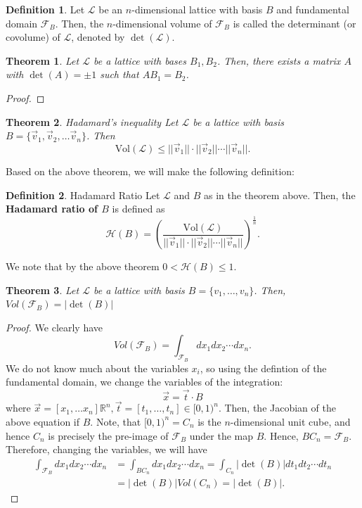 \documentclass{article}
\newtheorem{theorem}{Theorem}[section]
\theoremstyle{definition}
\newtheorem{definition}{Definition}[section]
\renewcommand{\L}{\mathcal{L}}
\newcommand{\F}{\mathcal{F}}
\newcommand{\Reals}{\mathbb{R}}
\renewcommand{\H}{\mathcal{H}}
\newcommand{\norm}[1]{||#1||}
\begin{document}
\begin{definition}
  Let $\L$ be an $n$-dimensional lattice with basis $B$ and fundamental domain
  $\F_B$. Then, the $n$-dimensional volume of $\F_B$ is called the determinant
  (or covolume) of $\L$, denoted by $\det(\L)$.
\end{definition}
\begin{theorem}
  \label{thm:lattice_change_of_basis}
  Let $\L$ be a lattice with bases $B_1, B_2$. Then, there exists a matrix $A$
  with $\det(A) = \pm 1$ such that $AB_1 = B_2$.
\end{theorem}
\begin{proof}
\end{proof}
\begin{theorem}{Hadamard's inequality}
  Let $\L$ be a lattice with basis $B = \{\vec{v}_1, \vec{v}_2, \hdots \vec{v}_n\}$. Then
\[
  \text{Vol}(\L) \leq \norm{\vec{v}_1}\cdot\norm{\vec{v}_2}\cdots\norm{\vec{v}_n}.
\]
\end{theorem}
Based on the above theorem, we will make the following definition:
\begin{definition}{Hadamard Ratio}
  Let $\L$ and $B$ as in the theorem above. Then, the \textbf{Hadamard ratio of $B$}
  is defined as
  \[
    \H(B) = \left( \frac{\text{Vol}(\L)}{\norm{\vec{v}_1}\cdot\norm{\vec{v}_2}\cdots\norm{\vec{v}_n}} \right)^{\frac1n}.
  \]
\end{definition}
We note that by the above theorem $0 < \H(B) \leq 1$.
\begin{theorem}
  Let $\L$ be a lattice with basis $B = \{v_1, \hdots, v_n\}$. Then, $Vol(\F_B) = |\det(B)|$
\end{theorem}
\begin{proof}
  We clearly have
  \[
    Vol(\F_B) = \int_{\F_B} dx_1dx_2\cdots dx_n.
  \]
  We do not know much about the variables $x_i$, so using the defintion of the
  fundamental domain, we change the variables of the integration:
  \[
    \vec{x} = \vec{t} \cdot B
  \]
  where $\vec{x} = [x_1, \hdots x_n] \Reals^n, \vec{t} = [t_1, \hdots, t_n] \in
  [0, 1)^n$. Then, the Jacobian of the above equation if $B$.
  Note, that $[0, 1)^n = C_n$ is the $n$-dimensional unit cube, and
  hence $C_n$ is precisely the pre-image of $\F_B$ under the map $B$. Hence, $BC_n = \F_B$.
  Therefore, changing the variables, we will have
  \begin{align*}
    \int_{\F_B} dx_1dx_2\cdots dx_n &= \int_{BC_n} dx_1dx_2\cdots dx_n =
                                      \int_{C_n} |\det(B)|dt_1dt_2\cdots dt_n \\
                                    &= |\det(B)|Vol(C_n) = |\det(B)|.
  \end{align*}
\end{proof}
\end{document}
